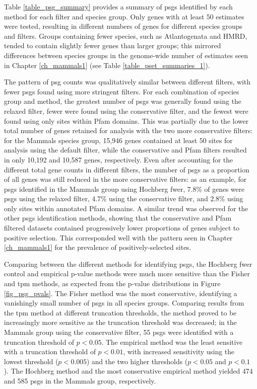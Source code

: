 Table \ref{table_psg_summary} provides a summary of \acp{psg}
identified by each method for each \sw filter and species group. Only
genes with at least 50 \sw estimates were tested, resulting in
different numbers of genes for different species groups and \sw
filters. Groups containing fewer species, such as Atlantogenata and
HMRD, tended to contain slightly fewer genes than larger groups; this
mirrored differences between species groups in the genome-wide number
of \sw estimates seen in Chapter \ref{ch_mammals1} (see Table
\ref{table_pset_summaries_1}).

The pattern of \ac{psg} counts was qualitatively similar between
different \sw filters, with fewer \acp{psg} found using more stringent
filters. For each combination of species group and method, the
greatest number of \acp{psg} was generally found using the relaxed
filter, fewer were found using the conservative filter, and the fewest
were found using only sites within Pfam domains. This was partially
due to the lower total number of genes retained for analysis with the
two more conservative filters: for the Mammals species group, 15,946
genes contained at least 50 sites for analysis using the default
filter, while the conservative and Pfam filters resulted in only
10,192 and 10,587 genes, respectively. Even after accounting for the
different total gene counts in different filters, the number of
\acp{psg} as a proportion of all genes was still reduced in the more
conservative filters: as an example, for \acp{psg} identified in the
Mammals group using Hochberg \ac{fwer}, 7.8\% of genes were \acp{psg}
using the relaxed filter, 4.7\% using the conservative filter, and
2.8\% using only sites within annotated Pfam domains. A similar trend
was observed for the other \acp{psg} identification methods, showing
that the conservative and Pfam filtered datasets contained
progressively lower proportions of genes subject to positive
selection. This corresponded well with the pattern seen in Chapter
\ref{ch_mammals1} for the prevalence of positively-selected sites.

Comparing between the different methods for identifying \acp{psg}, the
Hochberg \ac{fwer} control and empirical p-value methods were much
more sensitive than the Fisher and \ac{tpm} methods, as expected from
the p-value distributions in Figure \ref{fig_psg_pvals}. The Fisher
method was the most conservative, identifying a vanishingly small
number of \acp{psg} in all species groups. Comparing results from the
\ac{tpm} method at different truncation thresholds, the method proved
to be increasingly more sensitive as the truncation threshold was
decreased; in the Mammals group using the conservative filter, 55
\acp{psg} were identified with a truncation threshold of $p<0.05$. The
empirical method was the least sensitive with a truncation threshold
of $p<0.01$, with increased sensitivity using the lowest threshold
($p<0.005$) and the two higher thresholds ($p<0.05$ and $p<0.1$). The
Hochberg method and the most conservative empirical method yielded 474
and 585 \acp{psg} in the Mammals group, respectively.

